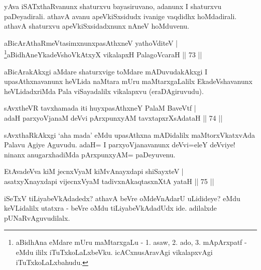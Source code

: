 \begin{artha} 
yAva iSATxthaRvanunx shaturxvu bayasiruvano, adanunx I shaturxvu 
paDeyadirali. athavA avanu apeVkiSxsidudx ivanige vaqdidhx 
hoMdadirali. athavA shaturxvu apeVkiSxsidadxnunx nAneV hoMduvenu.
\end{artha}


\begin{shl}
aBicArAthaRmeVtasimxnunxpasAthxneV yathoVditeV | \\
\footnote{aBidhAna eMdare mUru maMtarxgaLu - 1. asaw, 2. ado, 3. 
mApArxpatf - eMdu ililx iTuTxkoLaLxbeVku. icACxnusAravAgi vikalapxvAgi 
iTuTxkoLaLxbahudu.}aBidhAneYkadeVshoVkAtxyX vikalapxH PalagoVcaraH \hfill||  73 || 
\end{shl}

\begin{artha} 
aBicArakAkxgi aMdare shaturxvige toMdare mADuvudakAkxgi I 
upasAthxnavanunx heVLida naMtara mUru maMtarxgaLalilx EkadeVshavanunx 
heVLidadxriMda Pala viSayadalilx vikalapxvu (eraDAgiruvudu).
\end{artha}


\begin{shl}
sAvxtheVR tavxhamada iti huyxpasAthxneY PalaM BaveVtf | \\
adaH parxyoVjanaM deVvi pArxpunxyAM tavxtapxrXsAdataH \hfill||  74 || 
\end{shl}

\begin{artha} 
sAvxthaRkAkxgi `aha mada' eMdu upasAthxna mADidalilx maMtorxVkatxvAda 
Palavu Agiye Aguvudu. adaH= I parxyoVjanavanunx deVvi=eleY deVviye! 
ninanx anugarxhadiMda pArxpunxyAM= paDeyuvenu.
\end{artha}


\begin{shl}
EtAvadeVva kiM jecnxVyaM kiMvA\s nayxdapi shiSayxteV | \\
asatxyXnayxdapi vijecnxVyaM tadivxnA\s kaqtasxnXtA yataH \hfill||  75 || 
\end{shl}

\begin{artha} 
iSeTxV tiLiyabeVkAdadedx? athavA beVre oMdeVnAdarU uLidideye? eMdu 
keVLidalilx utatxra - beVre oMdu tiLiyabeVkAdadUdx ide. adilalxde 
pUNaRvAguvudilalx.
\end{artha}

